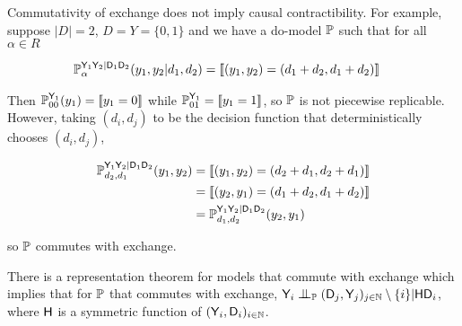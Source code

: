 Commutativity of exchange does not imply causal contractibility. For example, suppose $|D|=2$, $D=Y=\{0,1\}$ and we have a do-model $\mathbb{P}$ such that for all $\alpha\in R$

\begin{align}
    \mathbb{P}_\alpha^{\mathsf{Y}_1\mathsf{Y}_2|\mathsf{D}_1\mathsf{D}_2}(y_1,y_2|d_1,d_2) &= \llbracket (y_1,y_2)= (d_1+d_2,d_1+d_2) \rrbracket
\end{align}

Then $\mathbb{P}_{00}^{\mathsf{Y}_1}(y_1) = \llbracket y_1=0\rrbracket$ while $\mathbb{P}_{01}^{\mathsf{Y}_1} = \llbracket y_1=1 \rrbracket$, so $\mathbb{P}$ is not piecewise replicable. However, taking $(d_i,d_j)$ to be the decision function that deterministically chooses $(d_i,d_j)$,

\begin{align}
    \mathbb{P}_{d_2,d_1}^{\mathsf{Y}_1\mathsf{Y}_2|\mathsf{D}_1\mathsf{D}_2}(y_1,y_2) &= \llbracket (y_1,y_2)= (d_2+d_1,d_2+d_1) \rrbracket\\
    &= \llbracket (y_2,y_1)= (d_1+d_2,d_1+d_2) \rrbracket\\
    &= \mathbb{P}_{d_1,d_2}^{\mathsf{Y}_1\mathsf{Y}_2|\mathsf{D}_1\mathsf{D}_2}(y_2,y_1)
\end{align}

so $\mathbb{P}$ commutes with exchange.

There is a representation theorem for models that commute with exchange which implies that for $\mathbb{P}$ that commutes with exchange, $\RV{Y}_i\CI_{\prob{P}}(\RV{D}_j,\RV{Y}_j)_{j\in \mathbb{N}}\setminus \{i\}|\RV{H}\RV{D}_i$, where $\mathsf{H}$ is a symmetric function of $(\mathsf{Y}_i,\mathsf{D}_i)_{i\in\mathbb{N}}$.


